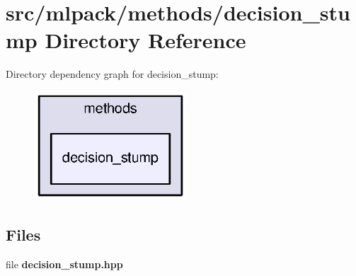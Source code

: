 \section{src/mlpack/methods/decision\+\_\+stump Directory Reference}
\label{dir_6a65b714e1a7118d6e7bc34f483b4517}
Directory dependency graph for decision\+\_\+stump\+:
\nopagebreak
\begin{figure}[H]
\begin{center}
\leavevmode
\includegraphics[width=162pt]{dir_6a65b714e1a7118d6e7bc34f483b4517_dep}
\end{center}
\end{figure}
\subsection*{Files}
\begin{DoxyCompactItemize}
\item 
file {\bf decision\+\_\+stump.\+hpp}
\end{DoxyCompactItemize}
